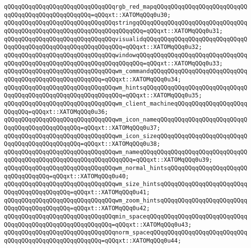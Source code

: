 \verb|qQQqqQQqqQQqqQQqqQQqqQQqqQQqqQQqrgb_red_mapqQQqqQQqqQQqqQQqqQQqqQQqqQQqqQQqqQQqqQQqqQQqqQQqqQQq=qQQqxt::XATOMqQQq0u30;|\newline
\verb|qQQqqQQqqQQqqQQqqQQqqQQqqQQqqQQqstringqQQqqQQqqQQqqQQqqQQqqQQqqQQqqQQqqQQqqQQqqQQqqQQqqQQqqQQqqQQqqQQqqQQqqQQq=qQQqxt::XATOMqQQq0u31;|\newline
\verb|qQQqqQQqqQQqqQQqqQQqqQQqqQQqqQQqvisualidqQQqqQQqqQQqqQQqqQQqqQQqqQQqqQQqqQQqqQQqqQQqqQQqqQQqqQQqqQQqqQQq=qQQqxt::XATOMqQQq0u32;|\newline
\verb|qQQqqQQqqQQqqQQqqQQqqQQqqQQqqQQqwindowqQQqqQQqqQQqqQQqqQQqqQQqqQQqqQQqqQQqqQQqqQQqqQQqqQQqqQQqqQQqqQQqqQQqqQQq=qQQqxt::XATOMqQQq0u33;|\newline
\verb|qQQqqQQqqQQqqQQqqQQqqQQqqQQqqQQqwm_commandqQQqqQQqqQQqqQQqqQQqqQQqqQQqqQQqqQQqqQQqqQQqqQQqqQQqqQQq=qQQqxt::XATOMqQQq0u34;|\newline
\verb|qQQqqQQqqQQqqQQqqQQqqQQqqQQqqQQqwm_hintsqQQqqQQqqQQqqQQqqQQqqQQqqQQqqQQqqQQqqQQqqQQqqQQqqQQqqQQqqQQqqQQq=qQQqxt::XATOMqQQq0u35;|\newline
\verb|qQQqqQQqqQQqqQQqqQQqqQQqqQQqqQQqwm_client_machineqQQqqQQqqQQqqQQqqQQqqQQqqQQq=qQQqxt::XATOMqQQq0u36;|\newline
\verb|qQQqqQQqqQQqqQQqqQQqqQQqqQQqqQQqwm_icon_nameqQQqqQQqqQQqqQQqqQQqqQQqqQQqqQQqqQQqqQQqqQQqqQQq=qQQqxt::XATOMqQQq0u37;|\newline
\verb|qQQqqQQqqQQqqQQqqQQqqQQqqQQqqQQqwm_icon_sizeqQQqqQQqqQQqqQQqqQQqqQQqqQQqqQQqqQQqqQQqqQQqqQQq=qQQqxt::XATOMqQQq0u38;|\newline
\verb|qQQqqQQqqQQqqQQqqQQqqQQqqQQqqQQqwm_nameqQQqqQQqqQQqqQQqqQQqqQQqqQQqqQQqqQQqqQQqqQQqqQQqqQQqqQQqqQQqqQQqqQQq=qQQqxt::XATOMqQQq0u39;|\newline
\verb|qQQqqQQqqQQqqQQqqQQqqQQqqQQqqQQqwm_normal_hintsqQQqqQQqqQQqqQQqqQQqqQQqqQQqqQQqqQQq=qQQqxt::XATOMqQQq0u40;|\newline
\verb|qQQqqQQqqQQqqQQqqQQqqQQqqQQqqQQqwm_size_hintsqQQqqQQqqQQqqQQqqQQqqQQqqQQqqQQqqQQqqQQqqQQq=qQQqxt::XATOMqQQq0u41;|\newline
\verb|qQQqqQQqqQQqqQQqqQQqqQQqqQQqqQQqwm_zoom_hintsqQQqqQQqqQQqqQQqqQQqqQQqqQQqqQQqqQQqqQQqqQQq=qQQqxt::XATOMqQQq0u42;|\newline
\verb|qQQqqQQqqQQqqQQqqQQqqQQqqQQqqQQqmin_spaceqQQqqQQqqQQqqQQqqQQqqQQqqQQqqQQqqQQqqQQqqQQqqQQqqQQqqQQqqQQq=qQQqxt::XATOMqQQq0u43;|\newline
\verb|qQQqqQQqqQQqqQQqqQQqqQQqqQQqqQQqnorm_spaceqQQqqQQqqQQqqQQqqQQqqQQqqQQqqQQqqQQqqQQqqQQqqQQqqQQqqQQq=qQQqxt::XATOMqQQq0u44;|\newline
